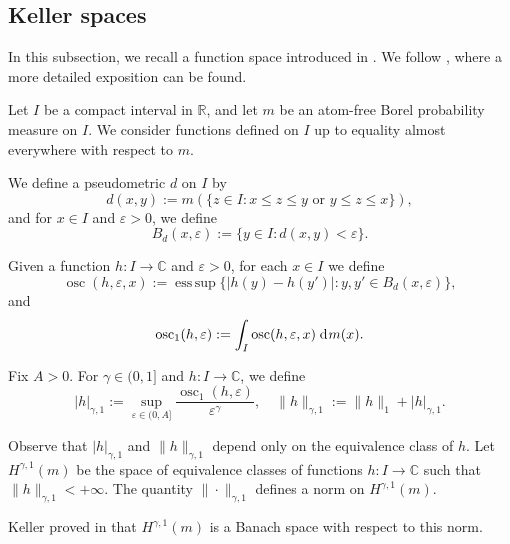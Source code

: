 \documentclass[12pt]{amsart}
\numberwithin{equation}{section} %
\numberwithin{figure}{section} %
\theoremstyle{plain}
\theoremstyle{definition}
\theoremstyle{remark}
\theoremstyle{citing}
\renewcommand{\=}{\coloneqq}
\newcommand{\dd}{\hspace{1pt}\operatorname{d}\hspace{-1pt}}
\begin{document}
\subsection{Keller spaces}\label{subseq: Keller spaces}

In this subsection, we recall a function space introduced in \cite{Keller1}. We follow \cite{Juan1}, where a more detailed exposition can be found.

Let $I$ be a compact interval in $\mathbb{R}$, and let $m$ be an atom-free Borel probability measure on $I$. We consider functions defined on $I$ up to equality almost everywhere with respect to $m$.

We define a pseudometric $d$ on $I$ by
\begin{equation*}
    d(x,y) := m(\{z\in I : x\leq z\leq y \text{ or } y\leq z \leq x\}),
\end{equation*}
and for $x\in I$ and $\varepsilon>0$, we define
\begin{equation*}
    B_d(x,\varepsilon) := \{y\in I : d(x,y)<\varepsilon\}.
\end{equation*}

Given a function $h\colon I \to \mathbb{C}$ and $\varepsilon>0$, for each $x\in I$ we define
\begin{equation*}
    \operatorname{osc}(h,\varepsilon,x) := \operatorname*{ess\,sup}\{|h(y)-h(y')| : y,y' \in B_d(x,\varepsilon)\},
\end{equation*}
and
\begin{equation*}
    \operatorname{osc}_1(h,\varepsilon) := \int_{I}\operatorname{osc}(h,\varepsilon,x) \dd m(x).
\end{equation*}

Fix $A>0$. For $\gamma\in(0,1]$ and $h\colon I\to\mathbb{C}$, we define
\begin{equation*}
    |h|_{\gamma,1} := \sup_{\varepsilon\in (0,A]} \frac{\operatorname{osc}_1(h,\varepsilon)}{\varepsilon^{\gamma}}, 
    \quad 
    \| h\|_{\gamma,1} := \| h\|_1 + |h|_{\gamma,1}.
\end{equation*}

Observe that $|h|_{\gamma,1}$ and $\|h\|_{\gamma,1}$ depend only on the equivalence class of $h$. Let $H^{\gamma,1}(m)$ be the space of equivalence classes of functions $h\colon I\to\mathbb{C}$ such that $\|h\|_{\gamma,1}<+\infty$. The quantity $\|\cdot\|_{\gamma,1}$ defines a norm on $H^{\gamma,1}(m)$.

Keller proved in \cite[Theorem 1.13]{Keller1} that $H^{\gamma,1}(m)$ is a Banach space with respect to this norm.
\end{document}
